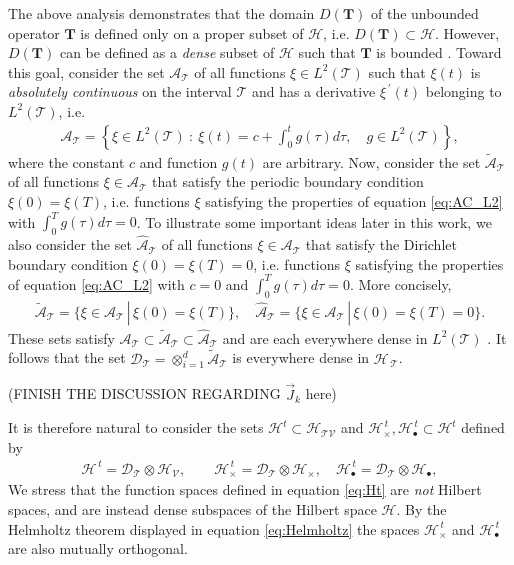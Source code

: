\documentclass[11pt]{amsart}
\newcommand{\Tb}{\mathbf{T}}
\newcommand{\Tc}{\mathcal{T}}
\newcommand{\Vc}{\mathcal{V}}
\newcommand{\Hs}{\mathscr{H}}
\newcommand{\As}{\mathscr{A}}
\newcommand{\Ds}{\mathscr{D}}
\begin{document}
The above analysis demonstrates that the domain $D(\Tb)$ of the
unbounded operator $\Tb$ is defined only on a proper subset of $\Hs$,
i.e. $D(\Tb)\subset\Hs$. However, $D(\Tb)$ can be defined as a \emph{dense}
subset of $\Hs$ such that $\Tb$ is bounded
\cite{Reed-1980,Stone:64}. Toward this goal, consider the set
$\As_{\Tc}$ of all functions $\xi\in L^2(\Tc)$ such that $\xi(t)$ is
\emph{absolutely continuous} \cite{Royden:1988:RA} on the interval
$\Tc$ and has a derivative $\xi^{\,\prime}(t)$ belonging to $L^2(\Tc)$,
i.e. \cite{Stone:64,Royden:1988:RA}   
%
\begin{align}\label{eq:AC_L2}
  \As_{\Tc}=\left\{
       \xi\in L^2(\Tc) \ : \ \xi(t)=c+\int_0^tg(\tau)d\tau, \quad  g\in L^2(\Tc)
       \right\},
\end{align}
%
where the constant $c$ and function $g(t)$ are
arbitrary. Now, consider the set $\tilde{\As}_{\Tc}$ of all
functions $\xi\in\As_{\Tc}$ that satisfy the periodic boundary
condition $\xi(0)=\xi(T)$, i.e. functions $\xi$ satisfying the properties of
equation \eqref{eq:AC_L2} with $\int_0^Tg(\tau)d\tau=0$. To illustrate some
important ideas later in this work, we also consider the
set $\hat{\As}_{\Tc}$ of all functions $\xi\in\As_{\Tc}$ that satisfy the
Dirichlet boundary condition $\xi(0)=\xi(T)=0$, i.e. functions $\xi$
satisfying the properties of equation \eqref{eq:AC_L2} with $c=0$ and
$\int_0^Tg(\tau)d\tau=0$. More concisely, 
%
\begin{align}
  \tilde{\As}_{\Tc}=\{\xi\in\As_{\Tc} \,|\, \xi(0)=\xi(T)\}, \quad
  \hat{\As}_{\Tc}=\{\xi\in\As_{\Tc} \,|\, \xi(0)=\xi(T)=0\}.
\end{align}
%
These sets satisfy $\As_{\Tc}\subset\tilde{\As}_{\Tc}\subset\hat{\As}_{\Tc}$ and
are each everywhere dense in $L^2(\Tc)$ \cite{Stone:64}. It follows
that the set $\Ds_{\Tc}=\otimes_{i=1}^d\tilde{\As}_{\Tc}$ is everywhere dense in
$\Hs_{\,\Tc}$.


(FINISH THE DISCUSSION REGARDING $\vec{J}_k$ here)

It is therefore natural to consider the sets
$\Hs^t\subset\Hs_{\Tc\Vc}$ and $\Hs_\times^{\,t},\Hs_\bullet^{\,t}\subset\Hs^t$
defined by
% 
\begin{align}\label{eq:Ht}
  \Hs^{\,t}=\Ds_{\Tc}\otimes\Hs_{\Vc}, \qquad
  \Hs_\times^{\,t}=\Ds_{\Tc}\otimes\Hs_\times, \quad
  \Hs_\bullet^{\,t}=\Ds_{\Tc}\otimes\Hs_\bullet,
\end{align}
%
We stress that the function spaces defined in equation \eqref{eq:Ht}
are \emph{not} Hilbert spaces, and are instead dense subspaces of the 
Hilbert space $\Hs$. By the Helmholtz theorem displayed in equation
\eqref{eq:Helmholtz} the spaces $\Hs_\times^{\,t}$ and $\Hs_\bullet^{\,t}$ are
also mutually orthogonal. 
\end{document}
